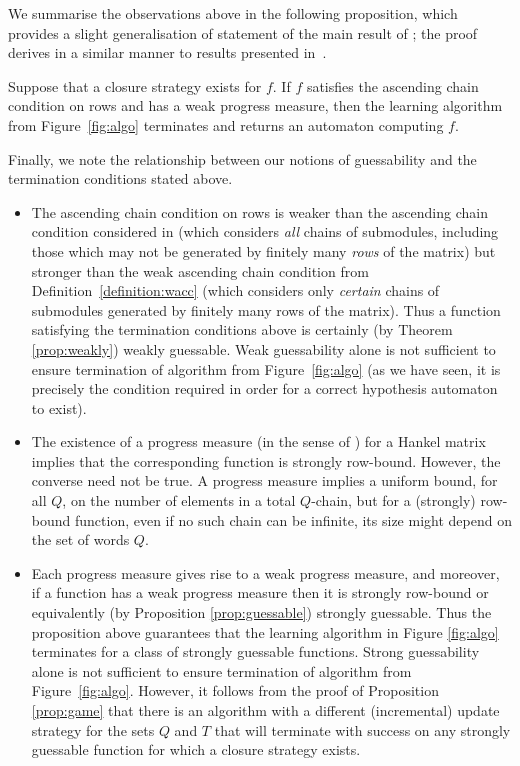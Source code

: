 \documentclass{lmcs}
\numberwithin{theorem}{section}
\begin{document}
We summarise the observations above in the following proposition, which provides a slight generalisation of statement of the main result of \cite{HKRS20}; the proof derives in a similar manner to results presented in~\cite{HKRS20}.

\begin{prop}\cite[Theorem 14]{HKRS20}
Suppose that a closure strategy exists for $f$. If $f$ satisfies the ascending chain condition on rows and has a weak progress measure, then the learning algorithm from Figure~\ref{fig:algo} terminates and returns an automaton computing $f$.
\end{prop}

\begin{rem}
\label{rem:terminate}
Finally, we note the relationship between our notions of guessability and the termination conditions stated above.
\begin{itemize}
\item The ascending chain condition on rows is weaker than the ascending chain condition considered in \cite{HKRS20} (which considers \emph{all} chains of submodules, including those which may not be generated by finitely many \emph{rows} of the matrix) but stronger than the weak ascending chain condition from Definition~\ref{definition:wacc} (which considers only \emph{certain} chains of submodules generated by finitely many rows of the matrix). Thus a function satisfying the termination conditions above is certainly (by Theorem \ref{prop:weakly})  weakly guessable. Weak guessability alone is not sufficient to ensure termination of algorithm from Figure~\ref{fig:algo} (as we have seen, it is precisely the condition required in order for a correct hypothesis automaton to exist).
\item  The existence of a progress measure (in the sense of \cite{HKRS20}) for a Hankel matrix implies that the corresponding function is strongly row-bound. However, the converse need not be true. A progress measure implies a uniform bound, for all $Q$, on the number of elements in a total $Q$-chain, but for a (strongly) row-bound function, even if no such chain can be infinite, its size might depend on the set of words $Q$. 
\item Each progress measure gives rise to a weak progress measure, and moreover, if a function has a weak progress measure then it is strongly row-bound or equivalently (by Proposition \ref{prop:guessable}) strongly guessable. Thus the proposition above guarantees that the learning algorithm in Figure \ref{fig:algo} terminates for a class of strongly guessable functions. Strong guessability alone is not sufficient to ensure termination of algorithm from Figure~\ref{fig:algo}. However, it follows from the proof of Proposition  \ref{prop:game} that there is an algorithm with a different (incremental) update strategy for the sets $Q$ and $T$ that will terminate with success on any strongly guessable function for which a closure strategy exists.
\end{itemize}
\end{rem}
\end{document}
